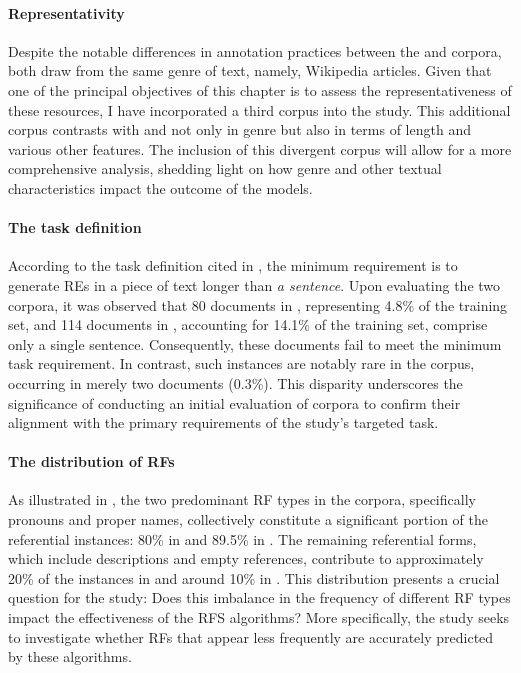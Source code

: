\paragraph*{Representativity} 
Despite the notable differences in annotation practices between the \msrcor and \negcor corpora, both draw from the same genre of text, namely, Wikipedia articles. Given that one of the principal objectives of this chapter is to assess the representativeness of these resources, I have incorporated a third corpus into the study. This additional corpus contrasts with \msrcor and \negcor not only in genre but also in terms of length and various other features. The inclusion of this divergent corpus will allow for a more comprehensive analysis, shedding light on how genre and other textual characteristics impact the outcome of the models.

\paragraph*{The \grec task definition}

According to the \grec task definition cited in , the minimum requirement is to generate REs in a piece of text longer than \emph{a sentence}. Upon evaluating the two corpora, it was observed that 80 documents in \msrcor, representing 4.8\% of the training set, and 114 documents in \negcor, accounting for 14.1\% of the training set, comprise only a single sentence. Consequently, these documents fail to meet the minimum task requirement. In contrast, such instances are notably rare in the \wsj corpus, occurring in merely two documents (0.3\%). This disparity underscores the significance of conducting an initial evaluation of corpora to confirm their alignment with the primary requirements of the study's targeted task.

\paragraph*{The distribution of RFs} 
As illustrated in , the two predominant RF types in the \grec corpora, specifically pronouns and proper names, collectively constitute a significant portion of the referential instances: 80\% in \msrcor and 89.5\% in \negcor. The remaining referential forms, which include descriptions and empty references, contribute to approximately 20\% of the instances in \msrcor and around 10\% in \negcor. This distribution presents a crucial question for the study: Does this imbalance in the frequency of different RF types impact the effectiveness of the RFS algorithms? More specifically, the study seeks to investigate whether RFs that appear less frequently are accurately predicted by these algorithms.

